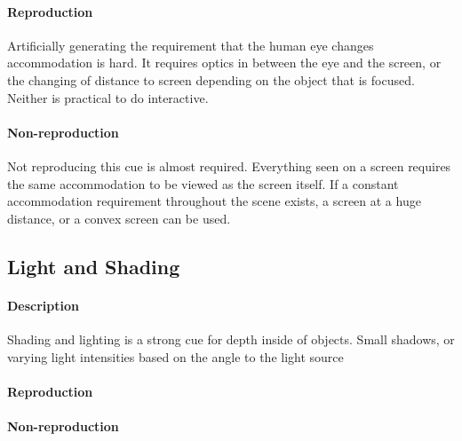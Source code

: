 \paragraph{Reproduction}
Artificially generating the requirement that the human eye changes accommodation is hard. It requires optics in between the eye and the screen, or the changing of distance to screen depending on the object that is focused. Neither is practical to do interactive.

\paragraph{Non-reproduction}
Not reproducing this cue is almost required. Everything seen on a screen requires the same accommodation to be viewed as the screen itself. If a constant accommodation requirement throughout the scene exists, a screen at a huge distance, or a convex screen can be used.


\subsection{Light and Shading}
\paragraph{Description}
Shading and lighting is a strong cue for depth inside of objects. Small shadows, or varying light intensities based on the angle to the light source

\paragraph{Reproduction}


\paragraph{Non-reproduction}

